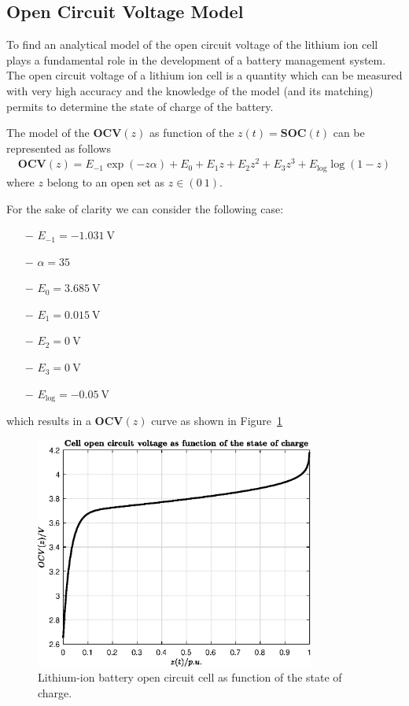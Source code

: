 \documentclass[11pt,a4paper,oneside]{book}
\numberwithin{equation}{section}
\theoremstyle{it}
\theoremstyle{definition}
\begin{document}
\subsection{Open Circuit Voltage Model}
To find an analytical model of the open circuit voltage of the lithium ion cell plays a fundamental role in the development of a battery management system. The open circuit voltage of a lithium ion cell is a quantity which can be measured with very high accuracy and the knowledge of the model (and its matching) permits to determine the state of charge of the battery.

The model of the $\mathbf{OCV}(z)$ as function of the $z(t)=\mathbf{SOC}(t)$ can be represented as follows
\begin{equation}
	\begin{aligned}
		\mathbf{OCV}(z) = E_{-1}\exp(-z\alpha) + E_0 + E_1z + E_2z^2 + E_3z^3 +  E_\text{log}\log({1-z})
	\end{aligned}
\end{equation}
where $z$ belong to an open set as $z\in\left(0\ 1\right)$.

For the sake of clarity we can consider the following case:
\begin{itemize}
	\item[$-$] $E_{-1}=\SI{-1.031}{\volt}$
	\item[$-$] $\alpha=\SI{35}{}$
	\item[$-$] $E_0=\SI{3.685}{\volt}$
	\item[$-$] $E_1=\SI{0.015}{\volt}$
	\item[$-$] $E_2=\SI{0}{\volt}$
	\item[$-$] $E_3=\SI{0}{\volt}$
	\item[$-$] $E_\text{log}=\SI{-0.05}{\volt}$
\end{itemize}
which results in a $\mathbf{OCV}(z)$ curve as shown in Figure~\ref{OCV} 
\begin{figure}[H]
	\centering
	\includegraphics[width = 260pt, angle = 0, keepaspectratio]{figures/lithium_ion_battery/OCV.eps}
	\captionsetup{width=0.5\textwidth, font=small}		
	\caption{Lithium-ion battery open circuit cell as function of the state of charge.}
	\label{OCV}
\end{figure}
\end{document}
